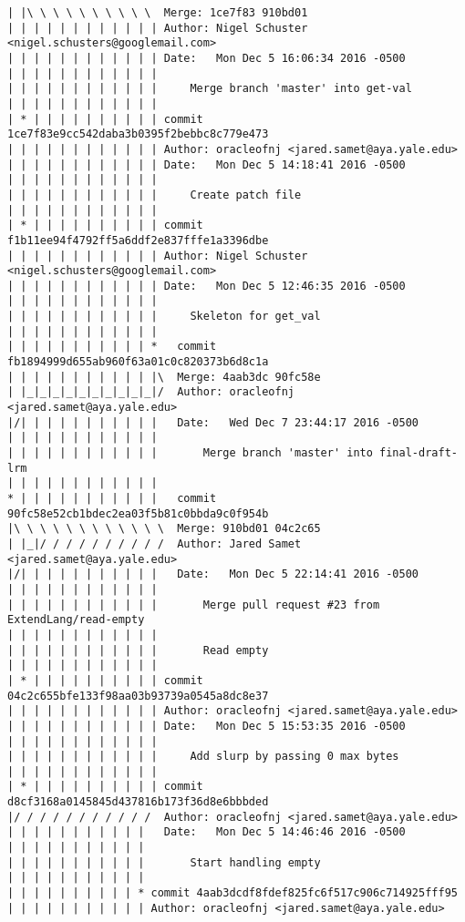 \begin{lstlisting}
| |\ \ \ \ \ \ \ \ \ \  Merge: 1ce7f83 910bd01
| | | | | | | | | | | | Author: Nigel Schuster <nigel.schusters@googlemail.com>
| | | | | | | | | | | | Date:   Mon Dec 5 16:06:34 2016 -0500
| | | | | | | | | | | | 
| | | | | | | | | | | |     Merge branch 'master' into get-val
| | | | | | | | | | | |             
| * | | | | | | | | | | commit 1ce7f83e9cc542daba3b0395f2bebbc8c779e473
| | | | | | | | | | | | Author: oracleofnj <jared.samet@aya.yale.edu>
| | | | | | | | | | | | Date:   Mon Dec 5 14:18:41 2016 -0500
| | | | | | | | | | | | 
| | | | | | | | | | | |     Create patch file
| | | | | | | | | | | |             
| * | | | | | | | | | | commit f1b11ee94f4792ff5a6ddf2e837fffe1a3396dbe
| | | | | | | | | | | | Author: Nigel Schuster <nigel.schusters@googlemail.com>
| | | | | | | | | | | | Date:   Mon Dec 5 12:46:35 2016 -0500
| | | | | | | | | | | | 
| | | | | | | | | | | |     Skeleton for get_val
| | | | | | | | | | | |               
| | | | | | | | | | | *   commit fb1894999d655ab960f63a01c0c820373b6d8c1a
| | | | | | | | | | | |\  Merge: 4aab3dc 90fc58e
| |_|_|_|_|_|_|_|_|_|_|/  Author: oracleofnj <jared.samet@aya.yale.edu>
|/| | | | | | | | | | |   Date:   Wed Dec 7 23:44:17 2016 -0500
| | | | | | | | | | | |   
| | | | | | | | | | | |       Merge branch 'master' into final-draft-lrm
| | | | | | | | | | | |               
* | | | | | | | | | | |   commit 90fc58e52cb1bdec2ea03f5b81c0bbda9c0f954b
|\ \ \ \ \ \ \ \ \ \ \ \  Merge: 910bd01 04c2c65
| |_|/ / / / / / / / / /  Author: Jared Samet <jared.samet@aya.yale.edu>
|/| | | | | | | | | | |   Date:   Mon Dec 5 22:14:41 2016 -0500
| | | | | | | | | | | |   
| | | | | | | | | | | |       Merge pull request #23 from ExtendLang/read-empty
| | | | | | | | | | | |       
| | | | | | | | | | | |       Read empty
| | | | | | | | | | | |             
| * | | | | | | | | | | commit 04c2c655bfe133f98aa03b93739a0545a8dc8e37
| | | | | | | | | | | | Author: oracleofnj <jared.samet@aya.yale.edu>
| | | | | | | | | | | | Date:   Mon Dec 5 15:53:35 2016 -0500
| | | | | | | | | | | | 
| | | | | | | | | | | |     Add slurp by passing 0 max bytes
| | | | | | | | | | | |             
| * | | | | | | | | | | commit d8cf3168a0145845d437816b173f36d8e6bbbded
|/ / / / / / / / / / /  Author: oracleofnj <jared.samet@aya.yale.edu>
| | | | | | | | | | |   Date:   Mon Dec 5 14:46:46 2016 -0500
| | | | | | | | | | |   
| | | | | | | | | | |       Start handling empty
| | | | | | | | | | |            
| | | | | | | | | | * commit 4aab3dcdf8fdef825fc6f517c906c714925fff95
| | | | | | | | | | | Author: oracleofnj <jared.samet@aya.yale.edu>

\end{lstlisting}
